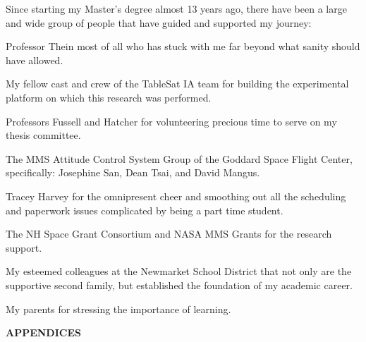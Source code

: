 \documentclass[11pt,doublespace]{unhthesis}
\begin{document}
\begin{acknowledgments}
Since starting my Master's degree almost 13 years ago, there have been a large and wide group of people that have guided and supported my journey:

Professor Thein most of all who has stuck with me far beyond what sanity should have allowed.

My fellow cast and crew of the TableSat IA team for building the experimental platform on which this research was performed.

Professors Fussell and Hatcher for volunteering precious time to serve on my thesis committee.

The MMS Attitude Control System Group of the Goddard Space Flight Center, specifically: Josephine San, Dean Tsai, and David Mangus.

Tracey Harvey for the omnipresent cheer and smoothing out all the scheduling and paperwork issues complicated by being a part time student.

The NH Space Grant Consortium and NASA MMS Grants for the research support.

My esteemed colleagues at the Newmarket School District that not only are the supportive second family, but established the foundation of my academic career.

My parents for stressing the importance of learning.
\end{acknowledgments}

\begin{singlespace}
  \tableofcontents
  \listoftables
  \listoffigures
\end{singlespace}

\begin{abstractpage}
\end{abstractpage}

















\newpage
\vspace*{100mm}
\begin{center}
  {\huge \bf APPENDICES}
\end{center}
\end{document}
